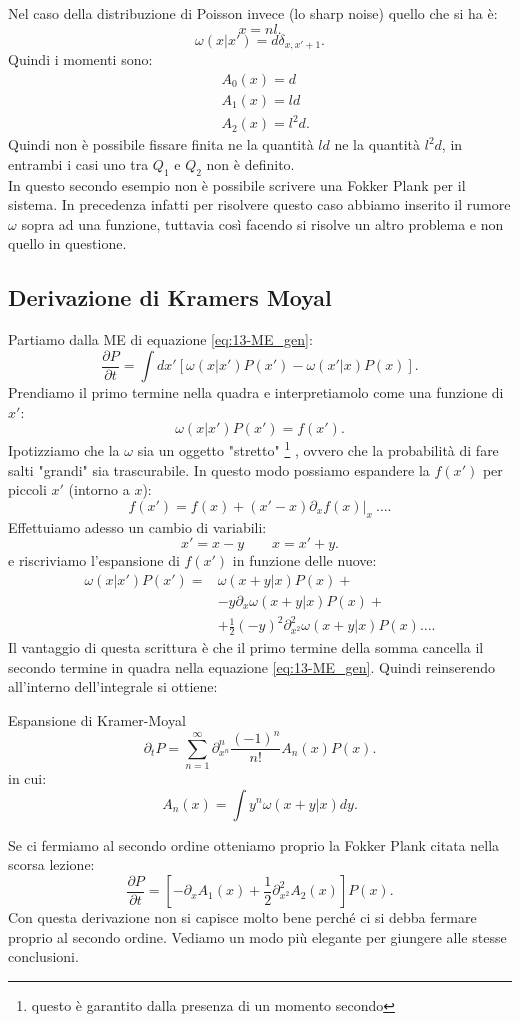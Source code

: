 \noindent
\begin{exmp}
    Nel caso della distribuzione di Poisson invece (lo sharp noise) quello che si ha è:
    \[
        x = nl
    .\] 
    \[
	\omega (x|x') = d\delta_{x,x'+1}
    .\] 
    Quindi i momenti sono:
    \[\begin{aligned}
	&A_0(x) = d\\
	&A_1(x) = ld\\
	&A_2(x) = l^2d
    .\end{aligned}\]
    Quindi non è possibile fissare finita ne la quantità $ld$ ne la quantità $l^2d$, in entrambi i casi uno tra $Q_1$ e $Q_2$ non è definito.\\
    In questo secondo esempio non è possibile scrivere una Fokker Plank per il sistema. In precedenza infatti per risolvere questo caso abbiamo inserito il rumore $\omega$ sopra ad una funzione, tuttavia così facendo si risolve un altro problema e non quello in questione.
\end{exmp}
\subsection{Derivazione di Kramers Moyal}%
Partiamo dalla ME di equazione \ref{eq:13-ME_gen}:
\[
    \frac{\partial P}{\partial t} = \int dx' \left[\omega (x|x') P(x') - \omega (x'|x) P(x) \right]
.\] 
Prendiamo il primo termine nella quadra e interpretiamolo come una funzione di $x'$:
\[
    \omega (x|x') P(x') = f(x') 
.\] 
Ipotizziamo che la $\omega$ sia un oggetto "stretto"
\footnote{questo è garantito dalla presenza di un momento secondo}
, ovvero che la probabilità di fare salti "grandi" sia trascurabile. In questo modo possiamo espandere la $f(x')$ per piccoli $x'$ (intorno a $x$):
\[
    f(x')  = f(x) + (x'-x) \left.\partial_{x}f(x) \right|_{x} \ \ldots
.\] 
Effettuiamo adesso un cambio di variabili: 
\[
    x' = x-y \qquad x = x'+y
.\] 
e riscriviamo l'espansione di $f(x')$ in funzione delle nuove:
\[\begin{aligned}
    \omega (x|x') P(x') =& \omega\left(x+y|x\right)P(x) +\\
			 & - y \partial_{x}\omega\left(x+y|x\right)P(x) + \\
			 & + \frac{1}{2}(-y) ^2\partial^2_{x^2}\omega (x+y|x) P(x) \ldots
.\end{aligned}\]
Il vantaggio di questa scrittura è che il primo termine della somma cancella il secondo termine in quadra nella equazione \ref{eq:13-ME_gen}.
Quindi reinserendo all'interno dell'integrale si ottiene:
\begin{redbox}{Espansione di Kramer-Moyal}
 \[
    \partial_{t}P = \sum_{n=1}^{\infty} \partial^n_{x^n} \frac{(-1)^n}{n!} A_n(x) P(x) 
.\]    
in cui:
\[
    A_n(x) = \int  y^n \omega (x+y|x) dy
.\] 
\end{redbox}
\noindent
Se ci fermiamo al secondo ordine otteniamo proprio la Fokker Plank citata nella scorsa lezione:
\[
    \frac{\partial P}{\partial t} = \left[-\partial_{x}A_1(x) + \frac{1}{2}\partial^2_{x^2} A_2(x) \right]P(x) 
.\] 
Con questa derivazione non si capisce molto bene perché ci si debba fermare proprio al secondo ordine. Vediamo un modo più elegante per giungere alle stesse conclusioni.
